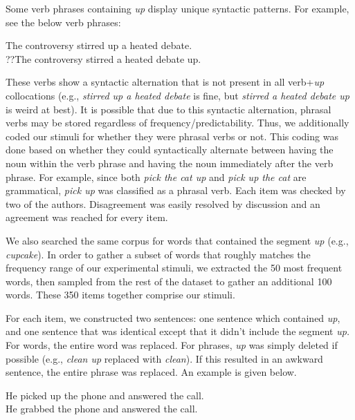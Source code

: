 \documentclass[
  man,floatsintext]{apa6}
\begin{document}
Some verb phrases containing \emph{up} display unique syntactic patterns. For example, see the below verb phrases:

\begin{exe} 
\ex
  \begin{xlist}
    \ex The controversy stirred up a heated debate. \\
    \ex ??The controversy stirred a heated debate up. \\
  \end{xlist}
\end{exe}

These verbs show a syntactic alternation that is not present in all verb+\emph{up} collocations (e.g., \emph{stirred up a heated debate} is fine, but \emph{stirred a heated debate up} is weird at best). It is possible that due to this syntactic alternation, phrasal verbs may be stored regardless of frequency/predictability. Thus, we additionally coded our stimuli for whether they were phrasal verbs or not. This coding was done based on whether they could syntactically alternate between having the noun within the verb phrase and having the noun immediately after the verb phrase. For example, since both \emph{pick the cat up} and \emph{pick up the cat} are grammatical, \emph{pick up} was classified as a phrasal verb. Each item was checked by two of the authors. Disagreement was easily resolved by discussion and an agreement was reached for every item.

We also searched the same corpus for words that contained the segment \emph{up} (e.g., \emph{cupcake}). In order to gather a subset of words that roughly matches the frequency range of our experimental stimuli, we extracted the 50 most frequent words, then sampled from the rest of the dataset to gather an additional 100 words. These 350 items together comprise our stimuli.

For each item, we constructed two sentences: one sentence which contained \emph{up}, and one sentence that was identical except that it didn't include the segment \emph{up.} For words, the entire word was replaced. For phrases, \emph{up} was simply deleted if possible (e.g., \emph{clean up} replaced with \emph{clean}). If this resulted in an awkward sentence, the entire phrase was replaced. An example is given below.

\begin{exe} 
\ex
  \begin{xlist}
    \ex He picked up the phone and answered the call. \\
    \ex He grabbed the phone and answered the call. \\
  \end{xlist}
\end{exe}
\end{document}
